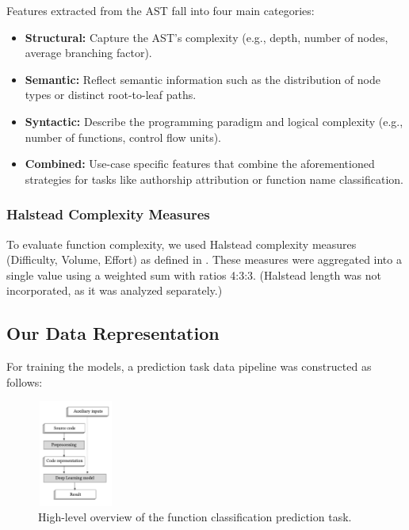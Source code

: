 \documentclass[conference]{IEEEtran}
\begin{document}
Features extracted from the AST fall into four main categories:
\begin{itemize}
    \item \textbf{Structural:} Capture the AST's complexity (e.g., depth, number of nodes, average branching factor).
    \item \textbf{Semantic:} Reflect semantic information such as the distribution of node types or distinct root-to-leaf paths.
    \item \textbf{Syntactic:} Describe the programming paradigm and logical complexity (e.g., number of functions, control flow units).
    \item \textbf{Combined:} Use-case specific features that combine the aforementioned strategies for tasks like authorship attribution or 
    function name classification.
\end{itemize}

\subsubsection{Halstead Complexity Measures}

To evaluate function complexity, we used Halstead complexity measures (Difficulty, Volume, Effort) as defined in \cite{halstead}. 
These measures were aggregated into a single value using a weighted sum with ratios 4:3:3. (Halstead length was not incorporated, as it was analyzed separately.)

\subsection{Our Data Representation}

For training the models, a prediction task data pipeline was constructed as follows:

\begin{figure}[!t]
    \centering
    \includegraphics[width=2.5cm,height=3.5cm]{figures/high_level_prediciton_task.png}
    \caption{\cite{compiler_based} High-level overview of the function classification prediction task.}
    \label{fig:predictive_task}
\end{figure}
\end{document}
